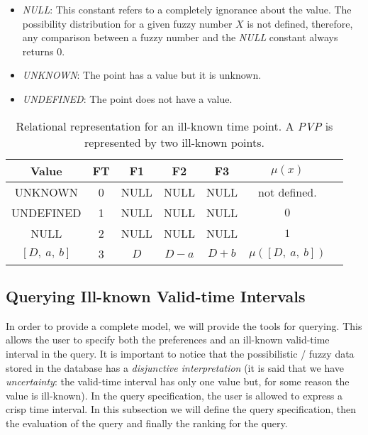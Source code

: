 \begin{itemize}
\item
\emph{NULL}: This constant refers to a completely ignorance about the value. The possibility distribution for a given fuzzy number $X$ is not defined, therefore, any comparison between a fuzzy number and the \emph{NULL} constant always returns $0$.
\item
\emph{UNKNOWN}: The point has a value but it is unknown.%
\item
\emph{UNDEFINED}: The point does not have a value. %
\end{itemize}


\begin{table}
\caption{Relational representation for an ill-known time point. A \emph{PVP} is represented by two ill-known points.}
\centering
\begin{tabular}{c c c c c c c}
\hline
Value & FT & F1 & F2 & F3 & $\mu(x)$ \\ \hline
UNKNOWN & 0 & NULL & NULL & NULL  & not defined. \\ 
UNDEFINED & 1 & NULL & NULL & NULL & $0$ \\ 
NULL & 2 & NULL & NULL & NULL & $1$  \\ 
$\left[D,\ a,\ b \right]$ & 3 & $D$ & $D-a$ & $D+b$ & $\mu(\left[D,\ a,\ b \right])$ \\ 
\hline
\end{tabular}
\label{table:relational-representation-pvp}
\end{table}

\subsection{Querying Ill-known Valid-time Intervals}
In order to provide a complete model, we will provide the tools for querying. This allows the user to specify both the preferences and an ill-known valid-time interval in the query. It is important to notice that the possibilistic / fuzzy data stored in the database has a \emph{disjunctive interpretation} (it is said that we have \emph{uncertainty}: the valid-time interval has only one value but, for some reason the value is ill-known). In the query specification, the user is allowed to express a crisp time interval. 
In this subsection we will define the query specification, then the evaluation of the query and finally the ranking for the query.

